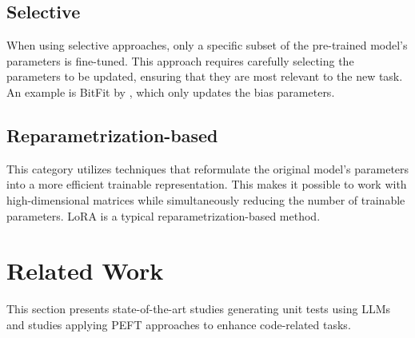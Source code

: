 \documentclass[12pt]{book}
\begin{document}
\subsection{Selective}
When using selective approaches, only a specific subset of the pre-trained model's parameters is fine-tuned. This approach requires carefully selecting the parameters to be updated, ensuring that they are most relevant to the new task. An example is BitFit by \citet{BenZaken2021BitFitSP}, which only updates the bias parameters.

\subsection{Reparametrization-based}
This category utilizes techniques that reformulate the original model's parameters into a more efficient trainable representation. This makes it possible to work with high-dimensional matrices while simultaneously reducing the number of trainable parameters. LoRA \citep{Yu2023LowRankAO} is a typical reparametrization-based method.

\section{Related Work}
\label{chap:related-work}
This section presents state-of-the-art studies generating unit tests using LLMs and studies applying PEFT approaches to enhance code-related tasks.  
\end{document}
